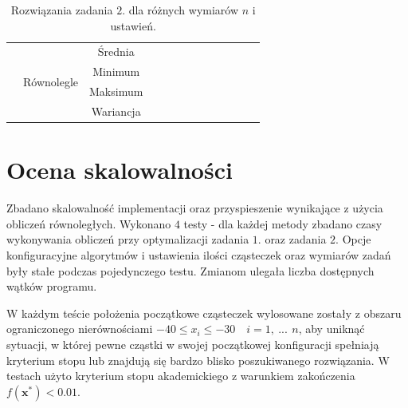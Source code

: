 \documentclass[11pt, a4paper, oneside]{article}
\newcommand{\vect}[1]{\bm{\mathbf{#1}}}
\begin{document}
\begin{table}[h]
\begin{adjustwidth}{-1cm}{}
\begin{tabular}{|c|c|c|l|l|l|l|l|l|l|l|l|l|}
                      & \multirow{4}{*}{Równolegle}   & Średnia   &                          &                         &                          &                         &                          &                         &                          &                         &                          &                         \\ \cline{3-13} 
                      &                               & Minimum   &                          &                         &                          &                         &                          &                         &                          &                         &                          &                         \\ \cline{3-13} 
                      &                               & Maksimum  &                          &                         &                          &                         &                          &                         &                          &                         &                          &                         \\ \cline{3-13} 
                      &                               & Wariancja &                          &                         &                          &                         &                          &                         &                          &                         &                          &                         \\ \hline
\end{tabular}
\end{adjustwidth}
\caption{Rozwiązania zadania $2$. dla różnych wymiarów $n$ i ustawień.}
\label{tab:rozw_zad2}
\end{table}

\section{Ocena skalowalności}

Zbadano skalowalność implementacji oraz przyspieszenie wynikające z użycia obliczeń równoległych. Wykonano $4$ testy - dla każdej metody zbadano czasy wykonywania obliczeń przy optymalizacji zadania $1$. oraz zadania $2$. Opcje konfiguracyjne algorytmów i ustawienia ilości cząsteczek oraz wymiarów zadań były stałe podczas pojedynczego testu. Zmianom ulegała liczba dostępnych wątków programu.

W każdym teście położenia początkowe cząsteczek wylosowane zostały z obszaru ograniczonego nierównościami $-40 \leq x_i \leq -30 \quad i = 1, \ ...\, \ n$, aby uniknąć sytuacji, w której pewne cząstki w swojej początkowej konfiguracji spełniają kryterium stopu lub znajdują się bardzo blisko poszukiwanego rozwiązania. W testach użyto kryterium stopu akademickiego z warunkiem zakończenia $f\left(\vect{x}^{*}\right) < 0.01$.
\end{document}
